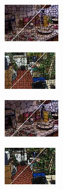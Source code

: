 \begin{figure}
\begin{subfigure}[b]{0.129\textwidth}
	\end{subfigure}
	\begin{subfigure}[b]{0.02\textwidth}
	\end{subfigure}
	\begin{subfigure}[b]{0.1375\textwidth}
		\includegraphics[height=1.65cm]{pictures/nyuv2/pb/cropped/pb_00000561_contours}
	\end{subfigure}
	\begin{subfigure}[b]{0.129\textwidth}
		\includegraphics[height=1.65cm]{pictures/sunrgbd/pb/cropped/pb_00004732_contours}
	\end{subfigure}
	\begin{subfigure}[b]{0.02\textwidth}
	\end{subfigure}
	\begin{subfigure}[b]{0.1375\textwidth}
		\includegraphics[height=1.65cm]{pictures/nyuv2/dasp/cropped/dasp_00000561_contours}
	\end{subfigure}
	\begin{subfigure}[b]{0.129\textwidth}
		\includegraphics[height=1.65cm]{pictures/sunrgbd/dasp/cropped/dasp_00004732_contours}
	\end{subfigure}\\
	\begin{subfigure}[b]{0.02\textwidth}
	\end{subfigure}

\end{figure}
